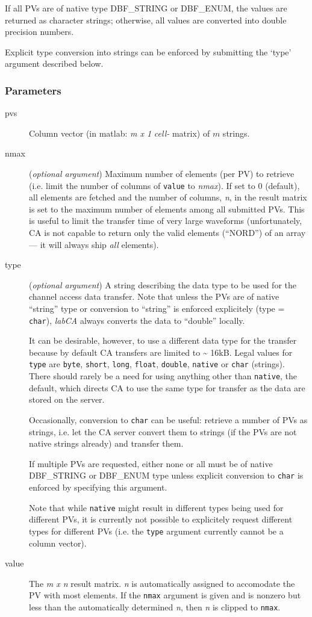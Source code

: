 \documentclass{article}
\newcommand{\sca}{\ita{labCA}}
\newcommand{\com}[1]{{\tt #1}}
\newcommand{\ita}[1]{\emph{#1}}
\newcommand{\m}{$m$}
\newcommand{\mhack}{$m$} %
\newcommand{\n}{$n$}
\newcommand{\mxn}{$m\times n$}
\newcommand{\mxl}{$m\times 1$}
\newcommand{\calimit}{$\approx 16$kB}
\renewcommand{\m}{\ita{m}}
\newcommand{\mhack}{\ita{m}} %
\renewcommand{\n}{\ita{n}}
\renewcommand{\mxn}{\ita{m x n}}
\renewcommand{\mxl}{\ita{m x 1}}
\renewcommand{\calimit}{\~{} 16kB}
\newcommand{\PVITEM}{
\item[pvs] Column vector (in matlab: \mxl{} \ita{cell-} matrix)
of \mhack{} strings.
}
\begin{document}
If all PVs are of native type DBF\_STRING or DBF\_ENUM, the
values are returned as character strings; otherwise,
all values are converted into double precision numbers.

Explicit type conversion into strings can be enforced by submitting
the `type' argument described below.
\subsubsection{Parameters}
\begin{description}
\PVITEM
%
%
\item[nmax] (\ita{optional argument}) Maximum number of elements
(per PV) to retrieve (i.e. limit the number of columns of \com{value} to
\ita{nmax}).
If set to 0 (default), all elements are fetched
and the number of columns, \n, in the result matrix is set to the
maximum number of elements among all submitted PVs. This is useful
to limit the transfer time of very large waveforms (unfortunately,
CA is not capable to return only the valid elements (``NORD'') of
an array --- it will always ship \ita{all} elements).
%
%
\item[type] (\ita{optional argument}) A string describing the
data type to be used for the channel access data transfer. Note
that unless the PVs are of native ``string'' type or conversion to
``string'' is enforced explicitely (type = \com{char}), \sca{}
always converts the data to ``double'' locally.

It can be desirable, however, to use a different data type for the
transfer because by default CA transfers are limited to \calimit.
Legal values for \com{type}{} are \com{byte}, \com{short}, \com{long},
\com{float}, \com{double}, \com{native} or \com{char} (strings).
There should rarely be a need for using anything other than \com{native},
the default, which directs CA to use the same type for transfer as the
data are stored on the server.

Occasionally, conversion to \com{char} can be useful: retrieve a number
of PVs as strings, i.e. let the CA server convert them to strings
(if the PVs are not native strings already) and transfer them.

If multiple PVs are requested, either none or all must be of native
DBF\_STRING or DBF\_ENUM type unless explicit conversion to \com{char}
is enforced by specifying this argument.

Note that while \com{native}{} might result in different types
being used for different PVs, it is currently not possible to
explicitely request different types for different PVs (i.e. the
\com{type}{} argument currently cannot be a column vector).
%
%
\item[value] The \mxn{} result matrix. \n{} is automatically
assigned to accomodate the PV with most elements. If the \com{nmax}{}
argument is given and is nonzero but less than the automatically
determined \n, then \n{} is clipped to \com{nmax}.


\end{description}
\end{document}

